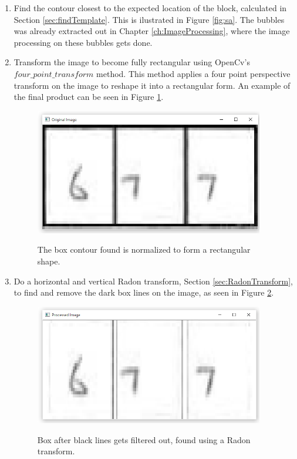 \begin{enumerate}
\item Find the contour closest to the expected location of the block, calculated in Section \ref{sec:findTemplate}. This is ilustrated in Figure \ref{fig:sa}. The bubbles was already extracted out in Chapter \ref{ch:ImageProcessing}, where the image processing on these bubbles gets done.



\item Transform the image to become fully rectangular using OpenCv's $four\_point\_transform$ method. This method applies a four point perspective transform on the image to reshape it into a rectangular form. An example of the final product can be seen in Figure \ref{fig:bp}.

\begin{figure}
  \centering
  \includegraphics[width=10cm]{BeforeProcessing}\\
  \caption{The box contour found is normalized to form a rectangular shape.}
  \label{fig:bp}
\end{figure}

\item Do a horizontal and vertical Radon transform, Section \ref{sec:RadonTransform}, to find and remove the dark box lines on the image, as seen in Figure \ref{fig:ar}.

\begin{figure}
  \centering
  \includegraphics[width=10cm]{AfterRadon}\\
  \caption{Box after black lines gets filtered out, found using a Radon transform.}
  \label{fig:ar}
\end{figure}


\end{enumerate}
